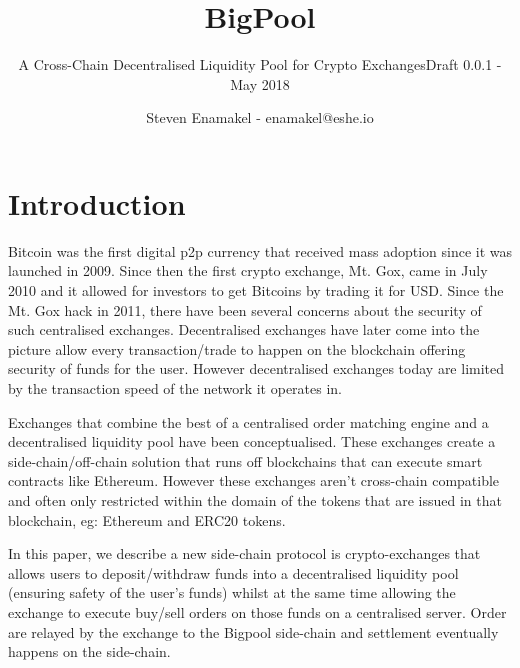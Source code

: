\documentclass{Bigpool}
\begin{document}
\begin{frontmatter}              %
	\title{BigPool}
	\subtitle{A Cross-Chain Decentralised Liquidity Pool for Crypto Exchanges}
	\subtitle{Draft 0.0.1 - May 2018}
	\author{Steven Enamakel - enamakel@eshe.io}

\end{frontmatter}


\section*{Introduction}
Bitcoin was the first digital p2p currency that received mass adoption since it was launched in 2009. Since then the first crypto exchange, Mt. Gox, came in July 2010 and it allowed for investors to get Bitcoins by trading it for USD. Since the Mt. Gox hack in 2011, there have been several concerns about the security of such centralised exchanges. Decentralised exchanges have later come into the picture allow every transaction/trade to happen on the blockchain offering security of funds for the user. However decentralised exchanges today are limited by the transaction speed of the network it operates in.

Exchanges that combine the best of a centralised order matching engine and a decentralised liquidity pool have been conceptualised. These exchanges create a side-chain/off-chain solution that runs off blockchains that can execute smart contracts like Ethereum. However these exchanges aren't cross-chain compatible and often only restricted within the domain of the tokens that are issued in that blockchain, eg: Ethereum and ERC20 tokens. 

In this paper, we describe a new side-chain protocol is crypto-exchanges that allows users to deposit/withdraw funds into a decentralised liquidity pool (ensuring safety of the user's funds) whilst at the same time allowing the exchange to execute buy/sell orders on those funds on a centralised server. Order are relayed by the exchange to the Bigpool side-chain and settlement eventually happens on the side-chain. 
\end{document}

